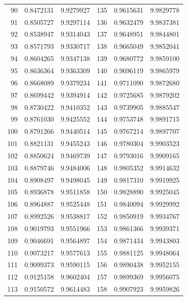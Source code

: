 \clearpage
\begin{center}
\begingroup\fontsize{9}{10.2}\selectfont\setlength{\tabcolsep}{4pt}\renewcommand{\arraystretch}{1.0}
\begin{tabular}{||r|r|r||r|r|r||}\hline\hline
90 & 0.8472131 & 9.9279927 & 135 & 0.9615631 & 9.9829778 \\
91 & 0.8505727 & 9.9297114 & 136 & 0.9632479 & 9.9837381 \\
92 & 0.8538947 & 9.9314043 & 137 & 0.9648951 & 9.9844801 \\
93 & 0.8571793 & 9.9330717 & 138 & 0.9665049 & 9.9852041 \\
94 & 0.8604265 & 9.9347138 & 139 & 0.9680772 & 9.9859100 \\
95 & 0.8636364 & 9.9363309 & 140 & 0.9696119 & 9.9865979 \\[3pt]
96 & 0.8668089 & 9.9379234 & 141 & 0.9711090 & 9.9872680 \\
97 & 0.8699442 & 9.9394914 & 142 & 0.9725685 & 9.9879202 \\
98 & 0.8730422 & 9.9410352 & 143 & 0.9739905 & 9.9885547 \\
99 & 0.8761030 & 9.9425552 & 144 & 0.9753748 & 9.9891715 \\
100 & 0.8791266 & 9.9440514 & 145 & 0.9767214 & 9.9897707 \\[3pt]
101 & 0.8821131 & 9.9455243 & 146 & 0.9780304 & 9.9903523 \\
102 & 0.8850624 & 9.9469739 & 147 & 0.9793016 & 9.9909165 \\
103 & 0.8879746 & 9.9484006 & 148 & 0.9805352 & 9.9914632 \\
104 & 0.8908497 & 9.9498045 & 149 & 0.9817310 & 9.9919925 \\
105 & 0.8936878 & 9.9511858 & 150 & 0.9828890 & 9.9925045 \\[3pt]
106 & 0.8964887 & 9.9525448 & 151 & 0.9840094 & 9.9929992 \\
107 & 0.8992526 & 9.9538817 & 152 & 0.9850919 & 9.9934767 \\
108 & 0.9019793 & 9.9551966 & 153 & 0.9861366 & 9.9939371 \\
109 & 0.9046691 & 9.9564897 & 154 & 0.9871434 & 9.9943803 \\
110 & 0.9073217 & 9.9577613 & 155 & 0.9881125 & 9.9948064 \\[3pt]
111 & 0.9099373 & 9.9590115 & 156 & 0.9890438 & 9.9952155 \\
112 & 0.9125158 & 9.9602404 & 157 & 0.9899369 & 9.9956075 \\
113 & 0.9150572 & 9.9614483 & 158 & 0.9907923 & 9.9959826 \\

\end{tabular}
\end{center}
